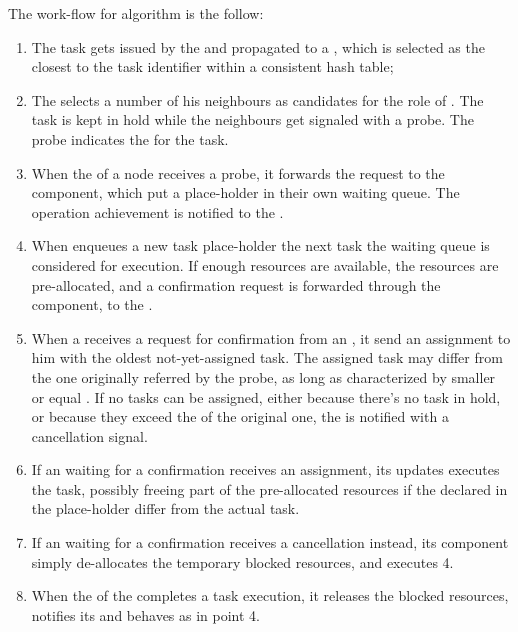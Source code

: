 \documentclass[conference]{IEEEtran}
\begin{document}
  The work-flow for \us algorithm is the follow:

  \begin{enumerate}

    \item The task gets issued by the \dc and propagated to a \tmast,
      which is selected as the closest to the task identifier within a
      consistent hash table;

    \item The \tmast selects a number of his neighbours as candidates for
      the role of \exc. The task is kept in hold while the neighbours get
      signaled with a probe. The probe indicates the \treq for the task.

    \item When the \ResourceManager of a node receives a probe, it
      forwards the request to the \RmWorker component, which put a
      place-holder in their own waiting queue. The operation achievement
      is notified to the \tmast.

    \item When \RmWorker enqueues a new task place-holder the next task
      the waiting queue is considered for execution. If enough resources
      are available, the \treq resources are pre-allocated, and a
      confirmation request is forwarded through the \ResourceManager
      component, to the \tmast.

    \item When a \tmast receives a request for confirmation from an \exc,
      it send an assignment to him with the oldest not-yet-assigned task.
      The assigned task may differ from the one originally referred by the
      probe, as long as characterized by smaller or equal \treq. If
      no tasks can be assigned, either because there's no task in hold, or
      because they exceed the \treq of the original one, the \exc is
      notified with a cancellation signal.

    \item If an \exc waiting for a confirmation receives an assignment,
      its \RmWorker updates executes the task, possibly freeing part of
      the pre-allocated resources if the \treq declared in the
      place-holder differ from the actual task.

    \item If an \exc waiting for a confirmation receives a cancellation
      instead, its \RmWorker component simply de-allocates the temporary
      blocked resources, and executes 4.

    \item When the \RmWorker of the \exc completes a task execution, it
      releases the blocked resources, notifies its \ResourceManager and
      behaves as in point 4.

  \end{enumerate}
\end{document}
